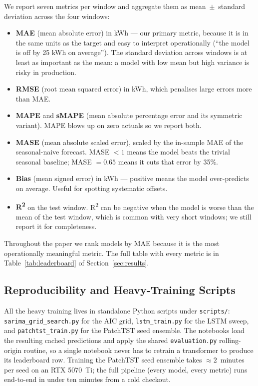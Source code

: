 We report seven metrics per window and aggregate them as
mean~$\pm$~standard deviation across the four windows:
\begin{itemize}[leftmargin=*]
    \item \textbf{MAE} (mean absolute error) in kWh --- our primary
    metric, because it is in the same units as the target and easy to
    interpret operationally (``the model is off by 25 kWh on
    average''). The standard deviation across windows is at least as
    important as the mean: a model with low mean but high variance is
    risky in production.
    \item \textbf{RMSE} (root mean squared error) in kWh, which
    penalises large errors more than MAE.
    \item \textbf{MAPE} and \textbf{sMAPE} (mean absolute percentage
    error and its symmetric variant). MAPE blows up on zero actuals
    so we report both.
    \item \textbf{MASE} (mean absolute scaled error), scaled by the
    in-sample MAE of the seasonal-naive forecast. MASE $< 1$ means
    the model beats the trivial seasonal baseline; MASE $= 0.65$
    means it cuts that error by 35\%.
    \item \textbf{Bias} (mean signed error) in kWh --- positive means
    the model over-predicts on average. Useful for spotting
    systematic offsets.
    \item \textbf{R\textsuperscript{2}} on the test window. R\textsuperscript{2}
    can be negative when the model is worse than the mean of the
    test window, which is common with very short windows; we still
    report it for completeness.
\end{itemize}
Throughout the paper we rank models by MAE because it is the most
operationally meaningful metric. The full table with every metric is
in Table~\ref{tab:leaderboard} of Section~\ref{sec:results}.

\subsection{Reproducibility and Heavy-Training Scripts}

All the heavy training lives in standalone Python scripts under
\texttt{scripts/}:
\texttt{sarima\_grid\_search.py} for the AIC grid,
\texttt{lstm\_train.py} for the LSTM sweep, and
\texttt{patchtst\_train.py} for the PatchTST seed ensemble. The
notebooks load the resulting cached predictions and apply the shared
\texttt{evaluation.py} rolling-origin routine, so a single notebook
never has to retrain a transformer to produce its leaderboard row.
Training the PatchTST seed ensemble takes $\approx 2$~minutes per
seed on an RTX 5070~Ti; the full pipeline (every model, every metric)
runs end-to-end in under ten minutes from a cold checkout.
